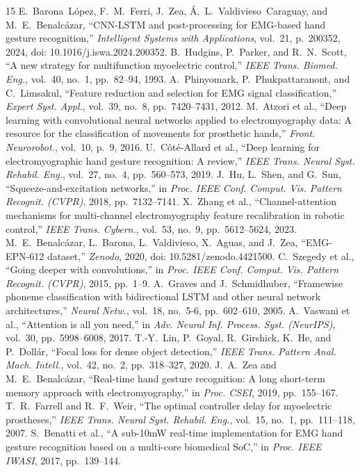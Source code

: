 \documentclass[conference]{IEEEtran}
\begin{document}
\begin{thebibliography}{15}
E.~Barona~L{\'o}pez, F.~M.~Ferri, J.~Zea, {\'A}.~L.~Valdivieso~Caraguay, and M.~E.~Benalc{\'a}zar, ``CNN-LSTM and post-processing for EMG-based hand gesture recognition,'' \emph{Intelligent Systems with Applications}, vol.~21, p.~200352, 2024, doi: 10.1016/j.iswa.2024.200352.
B.~Hudgins, P.~Parker, and R.~N.~Scott, ``A new strategy for multifunction myoelectric control,'' \emph{IEEE Trans. Biomed. Eng.}, vol.~40, no.~1, pp.~82--94, 1993.
A.~Phinyomark, P.~Phukpattaranont, and C.~Limsakul, ``Feature reduction and selection for EMG signal classification,'' \emph{Expert Syst. Appl.}, vol.~39, no.~8, pp.~7420--7431, 2012.
M.~Atzori et al., ``Deep learning with convolutional neural networks applied to electromyography data: A resource for the classification of movements for prosthetic hands,'' \emph{Front. Neurorobot.}, vol.~10, p.~9, 2016.
U.~C{\^o}t{\'e}-Allard et al., ``Deep learning for electromyographic hand gesture recognition: A review,'' \emph{IEEE Trans. Neural Syst. Rehabil. Eng.}, vol.~27, no.~4, pp.~560--573, 2019.
J.~Hu, L.~Shen, and G.~Sun, ``Squeeze-and-excitation networks,'' in \emph{Proc. IEEE Conf. Comput. Vis. Pattern Recognit. (CVPR)}, 2018, pp.~7132--7141.
X.~Zhang et al., ``Channel-attention mechanisms for multi-channel electromyography feature recalibration in robotic control,'' \emph{IEEE Trans. Cybern.}, vol.~53, no.~9, pp.~5612--5624, 2023.
M.~E.~Benalc{\'a}zar, L.~Barona, L.~Valdivieso, X.~Aguas, and J.~Zea, ``EMG-EPN-612 dataset,'' \emph{Zenodo}, 2020, doi: 10.5281/zenodo.4421500.
C.~Szegedy et al., ``Going deeper with convolutions,'' in \emph{Proc. IEEE Conf. Comput. Vis. Pattern Recognit. (CVPR)}, 2015, pp.~1--9.
A.~Graves and J.~Schmidhuber, ``Framewise phoneme classification with bidirectional LSTM and other neural network architectures,'' \emph{Neural Netw.}, vol.~18, no.~5-6, pp.~602--610, 2005.
A.~Vaswani et al., ``Attention is all you need,'' in \emph{Adv. Neural Inf. Process. Syst. (NeurIPS)}, vol.~30, pp.~5998--6008, 2017.
T.-Y.~Lin, P.~Goyal, R.~Girshick, K.~He, and P.~Doll{\'a}r, ``Focal loss for dense object detection,'' \emph{IEEE Trans. Pattern Anal. Mach. Intell.}, vol.~42, no.~2, pp.~318--327, 2020.
J.~A.~Zea and M.~E.~Benalc{\'a}zar, ``Real-time hand gesture recognition: A long short-term memory approach with electromyography,'' in \emph{Proc. CSEI}, 2019, pp.~155--167.
T.~R.~Farrell and R.~F.~Weir, ``The optimal controller delay for myoelectric prostheses,'' \emph{IEEE Trans. Neural Syst. Rehabil. Eng.}, vol.~15, no.~1, pp.~111--118, 2007.
S.~Benatti et al., ``A sub-10mW real-time implementation for EMG hand gesture recognition based on a multi-core biomedical SoC,'' in \emph{Proc. IEEE IWASI}, 2017, pp.~139--144.
\end{thebibliography}
\end{document}
